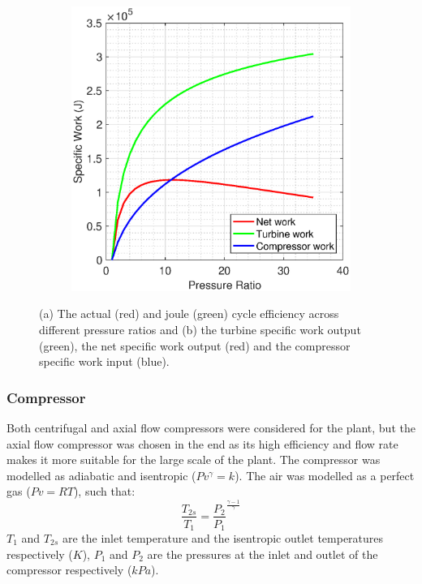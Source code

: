 \documentclass[11pt, oneside]{article}
\begin{document}
\begin{figure} [h]
\begin{subfigure}{.7\textwidth}
 \includegraphics[width=0.9\linewidth]{./pictures/network.eps}
 \label{fig:sub2}
\end{subfigure}
\caption{(a) The actual (red) and joule (green) cycle efficiency across different pressure ratios and (b) the turbine specific work output (green), the net specific work output (red) and the compressor specific work input (blue).}
\label{fig:efficiencysimple}
\end{figure} 

\subsubsection{Compressor} \label{ssec:compressor} %
Both centrifugal and axial flow compressors were considered for the plant, but the axial flow compressor was chosen in the end as its high efficiency and flow rate makes it more suitable for the large scale of the plant. The compressor was modelled as adiabatic and isentropic ($Pv^{\gamma} = k$). The air was modelled as a perfect gas ($Pv = RT$), such that:
\begin{equation}
\frac{T_{2s}}{T_1} = \frac{P_2}{P_1}^{\frac{\gamma-1}{\gamma}}
\end{equation}
$T_{1}$ and $T_{2s}$ are the inlet temperature and the isentropic outlet temperatures respectively ($K$), $P_1$ and $P_2$ are the pressures at the inlet and outlet of the compressor respectively ($kPa$).
\end{document}
